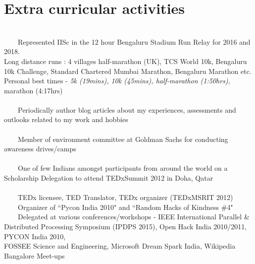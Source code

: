 \documentclass[a4paper,10pt]{article} %
\newcommand{\tabitem}{~~\llap{\textbullet}~~}
\begin{document}
\section{Extra curricular activities}
~\\
\tabitem Represented IISc in the 12 hour Bengaluru Stadium Run Relay for 2016 and 2018. \\ Long distance runs : 4 villages half-marathon (UK), TCS World 10k, Bengaluru 10k Challenge, Standard Chartered Mumbai Marathon, Bengaluru Marathon etc. \\ {\footnotesize Personal best times - \textit{5k (19mins), \space 10k (45mins), half-marathon (1:50hrs)}, marathon (4:17hrs) }\\
\\
\tabitem Periodically author blog articles about my experiences, assessments and outlooks related to my work and hobbies \\
\\
\tabitem Member of environment committee at Goldman Sachs for conducting awareness drives/camps \\
\\
\tabitem One of few Indians amongst participants from around the world on a Scholarship Delegation to attend TEDxSummit 2012 in Doha, Qatar \\
\\
\tabitem TEDx licensee, TED Translator, TEDx organizer (TEDxMSRIT 2012)\\
\tabitem Organizer of ``Pycon India 2010" and ``Random Hacks of Kindness \#4"\\
\tabitem Delegated at various conferences/workshops - IEEE International Parallel \& Distributed Processing Symposium (IPDPS 2015), Open Hack India 2010/2011, PYCON India 2010,\\ FOSSEE Science and Engineering, Microsoft Dream Spark India, Wikipedia Bangalore Meet-ups\\
\end{document}
